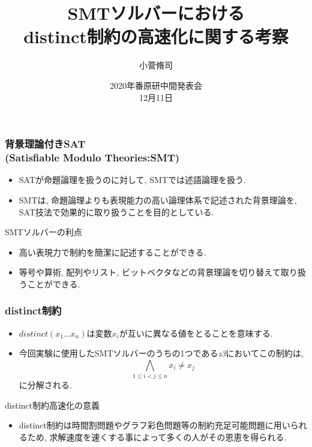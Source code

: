 \documentclass [dvipdfmx,12pt]{beamer}
\title{SMTソルバーにおける\\distinct制約の高速化に関する考察}
\author{小菅脩司}
\institute{番原研究室}
\date{2020年番原研中間発表会\\12月11日}
\begin{document}
\begin{frame} {}
\titlepage
\end{frame}



\begin{frame}
\frametitle{背景理論付きSAT\\(Satisfiable Modulo Theories:SMT)}
\begin{itemize}
\item SATが命題論理を扱うのに対して, SMTでは述語論理を扱う.
\item SMTは, 命題論理よりも表現能力の高い論理体系で記述された背景理論を, SAT技法で効果的に取り扱うことを目的としている.
\end{itemize}
\begin{alertblock}{SMTソルバーの利点}
\begin{itemize}
\item 高い表現力で制約を簡潔に記述することができる.
\item 等号や算術, 配列やリスト, ビットベクタなどの背景理論を切り替えて取り扱うことができる.
\end{itemize}
\end{alertblock}
\end{frame}



\begin{frame}
\frametitle{distinct制約}
\begin{block}{}
\begin{itemize}
\item $distinct(x_1 ... x_n)$は変数$x_i$が互いに異なる値をとることを意味する.
\item 今回実験に使用したSMTソルバーのうちの1つである\textit{z3}においてこの制約は, $$\bigwedge_{1 \leq i < j \leq n} x_i \neq x_j$$に分解される.
\end{itemize}
\end{block}
\begin{alertblock}{distinct制約高速化の意義}
\begin{itemize}
\item distinct制約は時間割問題やグラフ彩色問題等の制約充足可能問題に用いられるため, 求解速度を速くする事によって多くの人がその恩恵を得られる.
\end{itemize}
\end{alertblock}
\end{frame}
\end{document}
